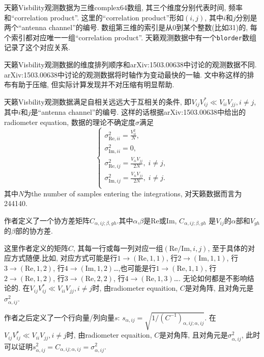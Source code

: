 \documentclass[12pt]{ctexart}
\def\v{\verb}
\begin{document}
天籁Visbility观测数据为三维complex64数组, 其三个维度分别代表时间, 频率和``correlation product''. 这里的``correlation product''形如$(i,j)$, 其中$i$和$j$分别是两个``antenna channel''的编号. 数组第三维的索引是从0到某个整数(比如31)的, 每个索引都对应唯一一组``correlation product''. 天籁观测数据中有一个\v|blorder|数组记录了这个对应关系.

天籁Visbility观测数据的维度排列顺序和arXiv:1503.00638中讨论的观测数据不同. arXiv:1503.00638中讨论的观测数据将时轴作为变动最快的一轴. 文中称这样的排布有助于压缩, 但实际计算发现并不对压缩有明显帮助.

天籁Visbility观测数据满足自相关远远大于互相关的条件, 即$V_{ij}V_{ij}^{*}\ll V_{ii}V_{jj}, i\ne j$, 其中$i$和$j$是``antenna channel''的编号. 这样的话根据arXiv:1503.00638中给出的radiometer equation, 数据的理论不确定度$\sigma$满足
\begin{equation}
    \begin{cases}
        \sigma_{\text{Re},ii}^{2}=\frac{V_{ii}^2}{N},\\
        \sigma_{\text{Im},ii}^{2}=0,\\
        \sigma_{\text{Re},ij}^{2}=\frac{V_{ii}V_{jj}}{2N}, \; i\ne j,\\
        \sigma_{\text{Im},ij}^{2}=\frac{V_{ii}V_{jj}}{2N}, \; i\ne j.\\
    \end{cases}
\end{equation}
其中$N$为the number of samples entering the integrations, 对天籁数据而言为244140.

作者定义了一个协方差矩阵$C_{\alpha,ij;\beta,gh}$.其中$\alpha$,$\beta$是$\text{Re}$或$\text{Im}$, $C_{\alpha,ij;\beta,gh}$ 是$V_{ij}$的$\alpha$部和$V_{gh}$的$\beta$部的协方差.

这里作者定义的矩阵$C$, 其每一行或每一列对应一组$(\text{Re}/\text{Im}, i, j)$, 至于具体的对应方式随便.比如, 对应方式可能是行$1 \rightarrow (\text{Re}, 1, 1)$, 行$2 \rightarrow (\text{Im}, 1, 1)$, 行$3 \rightarrow (\text{Re}, 1, 2)$, 行$4 \rightarrow (\text{Im}, 1, 2)$\dots ,也可能是行$1 \rightarrow (\text{Re}, 1, 1)$, 行$2 \rightarrow (\text{Re}, 1, 2)$, 行$3 \rightarrow (\text{Re}, 2, 2)$, 行$4 \rightarrow (\text{Re}, 1, 3)$\dots . 无论如何都是不影响结论的. 在$V_{ij}V_{ij}^{*}\ll V_{ii}V_{jj}, i\ne j$时, 由radiometer equaition, $C$是对角阵, 且对角元是$\sigma_{\alpha,ij}^{2}$.

作者之后定义了一个行向量/列向量$s$: $s_{\alpha,ij}=\sqrt{1/(C^{-1})_{\alpha,ij;\alpha,ij}}$. 在$V_{ij}V_{ij}^{*}\ll V_{ii}V_{jj}, i\ne j$时, 由radiometer equaition, $C$是对角阵, 且对角元是$\sigma_{\alpha,ij}^{2}$, 此时可以证明$s_{\alpha,ij}^{2}=C_{\alpha,ij;\alpha,ij}=\sigma_{\alpha,ij}^{2}$.
\end{document}
